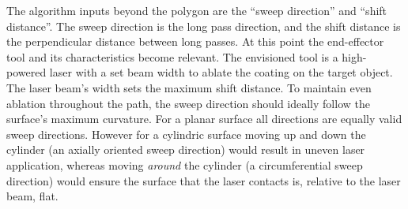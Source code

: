 The algorithm inputs beyond the polygon are the ``sweep direction'' and ``shift distance''.
The sweep direction is the long pass direction, and the shift distance is the perpendicular distance between long passes.
At this point the end-effector tool and its characteristics become relevant.
The envisioned tool is a high-powered laser with a set beam width to ablate the coating on the target object.
The laser beam's width sets the maximum shift distance.
To maintain even ablation throughout the path, the sweep direction should ideally follow the surface's maximum curvature.
For a planar surface all directions are equally valid sweep directions.
However for a cylindric surface moving up and down the cylinder (an axially oriented sweep direction) would result in uneven laser application, whereas moving \textit{around} the cylinder (a circumferential sweep direction) would ensure the surface that the laser contacts is, relative to the laser beam, flat.

